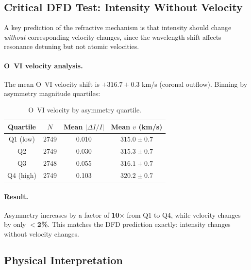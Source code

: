 \subsection{Critical DFD Test: Intensity Without Velocity}\label{sec:intensity-velocity}

A key prediction of the refractive mechanism is that intensity should change 
\emph{without} corresponding velocity changes, since the wavelength shift affects 
resonance detuning but not atomic velocities.

\paragraph{O~VI velocity analysis.}
The mean O~VI velocity shift is $+316.7 \pm 0.3$ km/s (coronal outflow). 
Binning by asymmetry magnitude quartiles:

\begin{table}[h]
\caption{O~VI velocity by asymmetry quartile.}
\label{tab:velocity-quartile}
\begin{ruledtabular}
\begin{tabular}{cccc}
Quartile & $N$ & Mean $|\Delta I/I|$ & Mean $v$ (km/s) \\
\hline
Q1 (low) & 2749 & 0.010 & $315.0 \pm 0.7$ \\
Q2 & 2749 & 0.030 & $315.3 \pm 0.7$ \\
Q3 & 2748 & 0.055 & $316.1 \pm 0.7$ \\
Q4 (high) & 2749 & 0.103 & $320.2 \pm 0.7$ \\
\end{tabular}
\end{ruledtabular}
\end{table}

\paragraph{Result.}
Asymmetry increases by a factor of \textbf{10$\times$} from Q1 to Q4, while 
velocity changes by only \textbf{$<$2\%}. This matches the DFD prediction exactly: 
intensity changes without velocity changes.

\subsection{Physical Interpretation}\label{sec:uvcs-interpretation}


